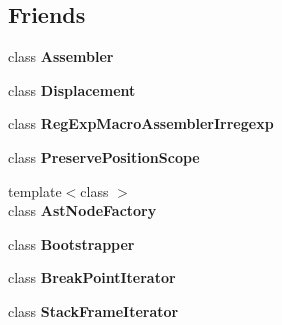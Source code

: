 \subsection*{Friends}
\begin{DoxyCompactItemize}
\item 
\hypertarget{classv8_1_1internal_1_1_b_a_s_e___e_m_b_e_d_d_e_d_a08829e094e460cdd0df495c883c39ce2}{}class {\bfseries Assembler}\label{classv8_1_1internal_1_1_b_a_s_e___e_m_b_e_d_d_e_d_a08829e094e460cdd0df495c883c39ce2}

\item 
\hypertarget{classv8_1_1internal_1_1_b_a_s_e___e_m_b_e_d_d_e_d_a14d5cd48e152856eb738eaee8144d357}{}class {\bfseries Displacement}\label{classv8_1_1internal_1_1_b_a_s_e___e_m_b_e_d_d_e_d_a14d5cd48e152856eb738eaee8144d357}

\item 
\hypertarget{classv8_1_1internal_1_1_b_a_s_e___e_m_b_e_d_d_e_d_a759a5177df4b99390b15abe3f6636449}{}class {\bfseries Reg\+Exp\+Macro\+Assembler\+Irregexp}\label{classv8_1_1internal_1_1_b_a_s_e___e_m_b_e_d_d_e_d_a759a5177df4b99390b15abe3f6636449}

\item 
\hypertarget{classv8_1_1internal_1_1_b_a_s_e___e_m_b_e_d_d_e_d_a483b906741855031773ade5ee7548b56}{}class {\bfseries Preserve\+Position\+Scope}\label{classv8_1_1internal_1_1_b_a_s_e___e_m_b_e_d_d_e_d_a483b906741855031773ade5ee7548b56}

\item 
\hypertarget{classv8_1_1internal_1_1_b_a_s_e___e_m_b_e_d_d_e_d_a364577e430004f74753a2a2ead71eddc}{}{\footnotesize template$<$class $>$ }\\class {\bfseries Ast\+Node\+Factory}\label{classv8_1_1internal_1_1_b_a_s_e___e_m_b_e_d_d_e_d_a364577e430004f74753a2a2ead71eddc}

\item 
\hypertarget{classv8_1_1internal_1_1_b_a_s_e___e_m_b_e_d_d_e_d_a9f6287f965eb4e105f67d204f94d55d2}{}class {\bfseries Bootstrapper}\label{classv8_1_1internal_1_1_b_a_s_e___e_m_b_e_d_d_e_d_a9f6287f965eb4e105f67d204f94d55d2}

\item 
\hypertarget{classv8_1_1internal_1_1_b_a_s_e___e_m_b_e_d_d_e_d_a096b3a9009a783c1025b73df216fa85f}{}class {\bfseries Break\+Point\+Iterator}\label{classv8_1_1internal_1_1_b_a_s_e___e_m_b_e_d_d_e_d_a096b3a9009a783c1025b73df216fa85f}

\item 
\hypertarget{classv8_1_1internal_1_1_b_a_s_e___e_m_b_e_d_d_e_d_a71cc3464740f5b07cfcdda465b494567}{}class {\bfseries Stack\+Frame\+Iterator}\label{classv8_1_1internal_1_1_b_a_s_e___e_m_b_e_d_d_e_d_a71cc3464740f5b07cfcdda465b494567}


\end{DoxyCompactItemize}
